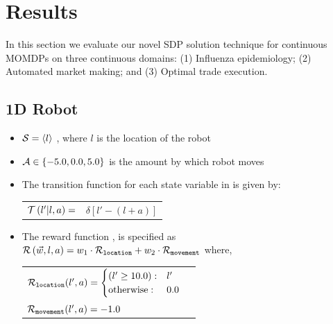 \section{Results}
\label{sec:results}

In this section we evaluate our novel SDP solution technique for continuous MOMDPs on three continuous domains: (1) Influenza epidemiology; (2) Automated market making; and (3) Optimal trade execution.

\subsection{1D Robot}
\label{ref:robot}

\begin{itemize}
    \item {\footnotesize $ \mathcal{S} = \left\langle l \right\rangle$ }, where $ l $ is the location of the robot
    \item {\footnotesize $ \mathcal{A} \in \left\lbrace -5.0, 0.0, 5.0 \right\rbrace $} is the amount by which robot moves
    \item The transition function {\footnotesize \Transition} for each state variable in {\footnotesize \State} is given by:    
    {\footnotesize 
        \abovedisplayskip=5pt
        \belowdisplayskip=0pt
        \renewcommand{\arraystretch}{1.5}
        \begin{tabular}{ll}
            $ \mathcal{T}\left( l' | l, a \right) =$ & $ \delta \left[ l' - (l + a) \right] $ \\
        \end{tabular}
    }%
    \item The reward function {\footnotesize \Reward}, is specified as {\footnotesize $ \mathcal{R}\left(\vec{w}, l, a \right) = w_1 \cdot \mathcal{R}_{\mathtt{location}} + w_2 \cdot \mathcal{R}_{\mathtt{movement}} $} where, \\
    {\footnotesize 
        \abovedisplayskip=10pt
        \belowdisplayskip=0pt
        \renewcommand{\arraystretch}{1.5}
        \begin{tabular}{ll}    
            $ \mathcal{R}_{\mathtt{location}}(l', a) = \begin{cases}
            (l' \geq 10.0) : & l' \\
            \text{otherwise} : & 0.0 \\
            \end{cases} $ & $ $\\
            $ \mathcal{R}_{\mathtt{movement}}(l', a) = -1.0 $ & $ $ \\                        
        \end{tabular}
    }    
\end{itemize} 

